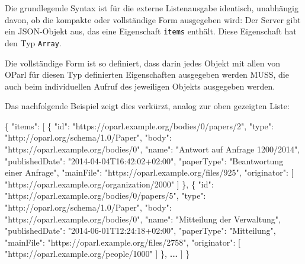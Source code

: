 \documentclass[,a4paper]{article}
\newenvironment{Shaded}{}{}
\newcommand{\DataTypeTok}[1]{\textcolor[rgb]{0.56,0.13,0.00}{{#1}}}
\newcommand{\StringTok}[1]{\textcolor[rgb]{0.25,0.44,0.63}{{#1}}}
\newcommand{\OtherTok}[1]{\textcolor[rgb]{0.00,0.44,0.13}{{#1}}}
\newcommand{\FunctionTok}[1]{\textcolor[rgb]{0.02,0.16,0.49}{{#1}}}
\newcommand{\ErrorTok}[1]{\textcolor[rgb]{1.00,0.00,0.00}{\textbf{{#1}}}}
\begin{document}
Die grundlegende Syntax ist für die externe Listenausgabe identisch,
unabhängig davon, ob die kompakte oder vollständige Form ausgegeben
wird: Der Server gibt ein JSON-Objekt aus, das eine Eigenschaft
\texttt{items} enthält. Diese Eigenschaft hat den Typ \texttt{Array}.

Die vollständige Form ist so definiert, dass darin jedes Objekt mit
allen von OParl für diesen Typ definierten Eigenschaften ausgegeben
werden MUSS, die auch beim individuellen Aufruf des jeweiligen Objekts
ausgegeben werden.

Das nachfolgende Beispiel zeigt dies verkürzt, analog zur oben gezeigten
Liste:

\begin{Shaded}
\begin{Highlighting}[]
\FunctionTok{\{}
    \DataTypeTok{"items"}\FunctionTok{:} \OtherTok{[}
        \FunctionTok{\{}
            \DataTypeTok{"id"}\FunctionTok{:} \StringTok{"https://oparl.example.org/bodies/0/papers/2"}\FunctionTok{,}
            \DataTypeTok{"type"}\FunctionTok{:} \StringTok{"http://oparl.org/schema/1.0/Paper"}\FunctionTok{,}
            \DataTypeTok{"body"}\FunctionTok{:} \StringTok{"https://oparl.example.org/bodies/0"}\FunctionTok{,}
            \DataTypeTok{"name"}\FunctionTok{:} \StringTok{"Antwort auf Anfrage 1200/2014"}\FunctionTok{,}
            \DataTypeTok{"publishedDate"}\FunctionTok{:} \StringTok{"2014-04-04T16:42:02+02:00"}\FunctionTok{,}
            \DataTypeTok{"paperType"}\FunctionTok{:} \StringTok{"Beantwortung einer Anfrage"}\FunctionTok{,}
            \DataTypeTok{"mainFile"}\FunctionTok{:} \StringTok{"https://oparl.example.org/files/925"}\FunctionTok{,}
            \DataTypeTok{"originator"}\FunctionTok{:} \OtherTok{[}
                \StringTok{"https://oparl.example.org/organization/2000"}
            \OtherTok{]}
        \FunctionTok{\}}\OtherTok{,}
        \FunctionTok{\{}
            \DataTypeTok{"id"}\FunctionTok{:} \StringTok{"https://oparl.example.org/bodies/0/papers/5"}\FunctionTok{,}
            \DataTypeTok{"type"}\FunctionTok{:} \StringTok{"http://oparl.org/schema/1.0/Paper"}\FunctionTok{,}
            \DataTypeTok{"body"}\FunctionTok{:} \StringTok{"https://oparl.example.org/bodies/0"}\FunctionTok{,}
            \DataTypeTok{"name"}\FunctionTok{:} \StringTok{"Mitteilung der Verwaltung"}\FunctionTok{,}
            \DataTypeTok{"publishedDate"}\FunctionTok{:} \StringTok{"2014-06-01T12:24:18+02:00"}\FunctionTok{,}
            \DataTypeTok{"paperType"}\FunctionTok{:} \StringTok{"Mitteilung"}\FunctionTok{,}
            \DataTypeTok{"mainFile"}\FunctionTok{:} \StringTok{"https://oparl.example.org/files/2758"}\FunctionTok{,}
            \DataTypeTok{"originator"}\FunctionTok{:} \OtherTok{[}
                \StringTok{"https://oparl.example.org/people/1000"}
            \OtherTok{]}
        \FunctionTok{\}}\OtherTok{,}
        \ErrorTok{...}
    \OtherTok{]}
\FunctionTok{\}}
\end{Highlighting}
\end{Shaded}
\end{document}
